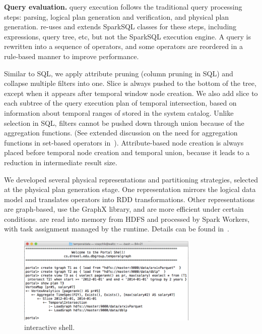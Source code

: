 {\bf Query evaluation.}  \sys query execution follows the traditional
query processing steps: parsing, logical plan generation and
verification, and physical plan generation. \sys re-uses and extends
SparkSQL classes for these steps, including expressions, query tree,
etc, but not the SparkSQL execution engine.  A \ql query is rewritten
into a sequence of \tga operators, and some operators are reordered in
a rule-based manner to improve performance.

Similar to SQL, we apply attribute pruning (column pruning in SQL) and
collapse multiple filters into one.  Slice is always pushed to the
bottom of the tree, except when it appears after temporal window node
creation.  We also add slice to each subtree of the query execution
plan of temporal intersection, based on information about temporal
ranges of \tgs stored in the system catalog.  Unlike selection in SQL, filters
cannot be pushed down through union because of the aggregation
functions.  (See extended discussion on the need for aggregation
functions in set-based operators in~\cite{PortalarXiv2016}).
Attribute-based node creation is always placed before temporal node
creation and temporal union, because it leads to a reduction in
intermediate result size.

We developed several physical representations and partitioning
strategies, selected at the physical plan generation stage.  One
representation mirrors the logical data model and translates \tga
operators into RDD transformations.  Other representations are
graph-based, use the GraphX library, and are more efficient under
certain conditions.  \tgs are read into memory from HDFS and processed
by Spark Workers, with task assignment managed by the runtime.
Details can be found in~\cite{PortalarXiv2016}.

\begin{figure}[t]
\centering
\includegraphics[width=3.4in]{figs/shell.png}
\vspace{-0.5cm}
\caption{\sys interactive shell.}
\vspace{-0.5cm}
\label{fig:shell}
\end{figure}

